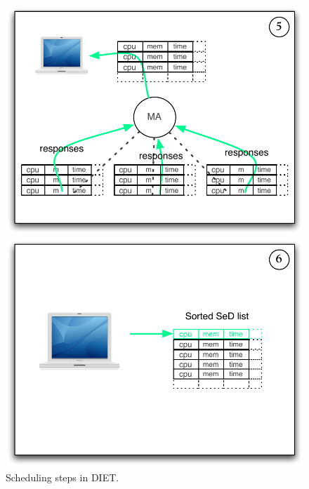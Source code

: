 \begin{figure}[h]
\begin{minipage}{\schdlFigWidth}
    \includegraphics[width=\schdlFigWidth]{fig/schdl04}
  \end{minipage}
  \begin{minipage}{\schdlFigWidth}
    \includegraphics[width=\schdlFigWidth]{fig/schdl05}
  \end{minipage}
  \caption{Scheduling steps in DIET.\label{scheduleSteps}}
\end{figure}

